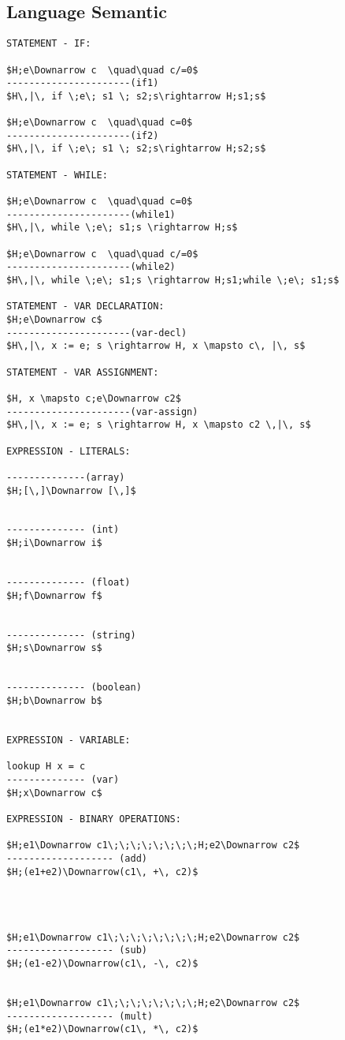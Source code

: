 \documentclass[11pt, a4paper]{article}
\begin{document}
\subsection*{Language Semantic}
\begin{lstlisting}
STATEMENT - IF:

$H;e\Downarrow c  \quad\quad c/=0$
----------------------(if1)
$H\,|\, if \;e\; s1 \; s2;s\rightarrow H;s1;s$

$H;e\Downarrow c  \quad\quad c=0$
----------------------(if2)
$H\,|\, if \;e\; s1 \; s2;s\rightarrow H;s2;s$

STATEMENT - WHILE:

$H;e\Downarrow c  \quad\quad c=0$
----------------------(while1)
$H\,|\, while \;e\; s1;s \rightarrow H;s$

$H;e\Downarrow c  \quad\quad c/=0$
----------------------(while2)
$H\,|\, while \;e\; s1;s \rightarrow H;s1;while \;e\; s1;s$

STATEMENT - VAR DECLARATION:
$H;e\Downarrow c$
----------------------(var-decl)
$H\,|\, x := e; s \rightarrow H, x \mapsto c\, |\, s$

STATEMENT - VAR ASSIGNMENT:

$H, x \mapsto c;e\Downarrow c2$
----------------------(var-assign)
$H\,|\, x := e; s \rightarrow H, x \mapsto c2 \,|\, s$

EXPRESSION - LITERALS:

--------------(array)
$H;[\,]\Downarrow [\,]$


-------------- (int)
$H;i\Downarrow i$


-------------- (float)
$H;f\Downarrow f$


-------------- (string)
$H;s\Downarrow s$


-------------- (boolean)
$H;b\Downarrow b$


EXPRESSION - VARIABLE:

lookup H x = c
-------------- (var)
$H;x\Downarrow c$

EXPRESSION - BINARY OPERATIONS:

$H;e1\Downarrow c1\;\;\;\;\;\;\;\;H;e2\Downarrow c2$
------------------- (add)
$H;(e1+e2)\Downarrow(c1\, +\, c2)$




$H;e1\Downarrow c1\;\;\;\;\;\;\;\;H;e2\Downarrow c2$
------------------- (sub)
$H;(e1-e2)\Downarrow(c1\, -\, c2)$


$H;e1\Downarrow c1\;\;\;\;\;\;\;\;H;e2\Downarrow c2$
------------------- (mult)
$H;(e1*e2)\Downarrow(c1\, *\, c2)$



\end{lstlisting}
\end{document}
